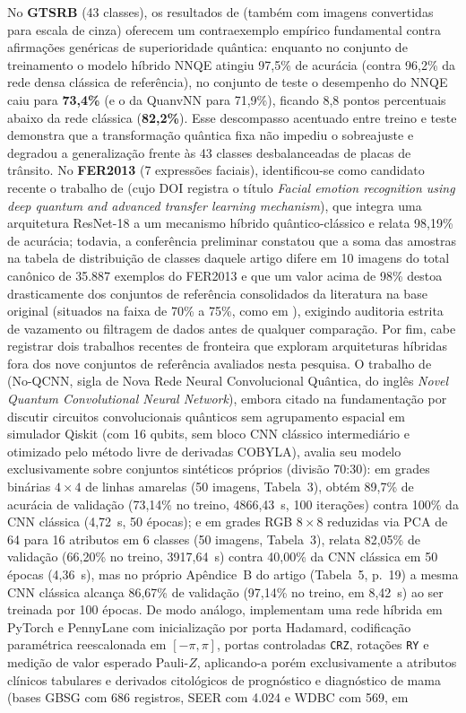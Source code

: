 \documentclass[
    12pt,
    openright,
    oneside,
    a4paper,
    english,
    brazil
]{abntex2}
\begin{document}
No \textbf{GTSRB} (43 classes), os resultados de  (também com imagens convertidas para escala de cinza) oferecem um contraexemplo empírico fundamental contra afirmações genéricas de superioridade quântica: enquanto no conjunto de treinamento o modelo híbrido NNQE atingiu 97,5\% de acurácia (contra 96,2\% da rede densa clássica de referência), no conjunto de teste o desempenho do NNQE caiu para \textbf{73,4\%} (e o da QuanvNN para 71,9\%), ficando 8,8 pontos percentuais abaixo da rede clássica (\textbf{82,2\%}). Esse descompasso acentuado entre treino e teste demonstra que a transformação quântica fixa não impediu o sobreajuste e degradou a generalização frente às 43 classes desbalanceadas de placas de trânsito. No \textbf{FER2013} (7 expressões faciais), identificou-se como candidato recente o trabalho de  (cujo DOI registra o título \textit{Facial emotion recognition using deep quantum and advanced transfer learning mechanism}), que integra uma arquitetura ResNet-18 \cite{he2016resnet} a um mecanismo híbrido quântico-clássico e relata 98,19\% de acurácia; todavia, a conferência preliminar constatou que a soma das amostras na tabela de distribuição de classes daquele artigo difere em 10 imagens do total canônico de 35.887 exemplos do FER2013 e que um valor acima de 98\% destoa drasticamente dos conjuntos de referência consolidados da literatura na base original (situados na faixa de 70\% a 75\%, como em ), exigindo auditoria estrita de vazamento ou filtragem de dados antes de qualquer comparação. Por fim, cabe registrar dois trabalhos recentes de fronteira que exploram arquiteturas híbridas fora dos nove conjuntos de referência avaliados nesta pesquisa. O trabalho de  (No-QCNN, sigla de Nova Rede Neural Convolucional Quântica, do inglês \textit{Novel Quantum Convolutional Neural Network}), embora citado na fundamentação por discutir circuitos convolucionais quânticos sem agrupamento espacial em simulador Qiskit (com 16 qubits, sem bloco CNN clássico intermediário e otimizado pelo método livre de derivadas COBYLA), avalia seu modelo exclusivamente sobre conjuntos sintéticos próprios (divisão 70:30): em grades binárias \(4 \times 4\) de linhas amarelas (50 imagens, Tabela~3), obtém 89,7\% de acurácia de validação (73,14\% no treino, 4866,43~s, 100 iterações) contra 100\% da CNN clássica (4,72~s, 50 épocas); e em grades RGB \(8 \times 8\) reduzidas via PCA de 64 para 16 atributos em 6 classes (50 imagens, Tabela~3), relata 82,05\% de validação (66,20\% no treino, 3917,64~s) contra 40,00\% da CNN clássica em 50 épocas (4,36~s), mas no próprio Apêndice~B do artigo (Tabela~5, p.~19) a mesma CNN clássica alcança 86,67\% de validação (97,14\% no treino, em 8,42~s) ao ser treinada por 100 épocas. De modo análogo,  implementam uma rede híbrida em PyTorch e PennyLane com inicialização por porta Hadamard, codificação paramétrica reescalonada em \([-\pi, \pi]\), portas controladas \texttt{CRZ}, rotações \texttt{RY} e medição de valor esperado Pauli-\(Z\), aplicando-a porém exclusivamente a atributos clínicos tabulares e derivados citológicos de prognóstico e diagnóstico de mama (bases GBSG com 686 registros, SEER com 4.024 e WDBC com 569, em 
\end{document}

